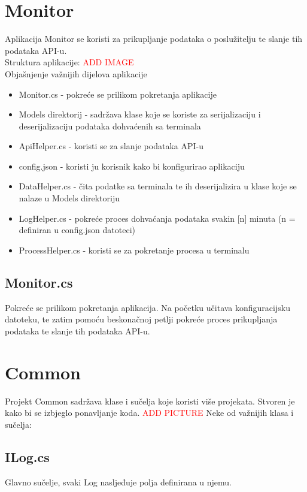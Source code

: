 \documentclass[zavrsnirad]{fer}
\begin{document}
\section{Monitor}
Aplikacija Monitor se koristi za prikupljanje podataka o poslužitelju te slanje tih podataka API-u.
\\Struktura aplikacije: \textcolor{red}{ADD IMAGE}
\\Objašnjenje važnijih dijelova aplikacije
\begin{itemize}
	\item Monitor.cs - pokreće se prilikom pokretanja aplikacije
	\item Models direktorij - sadržava klase koje se koriste za serijalizaciju i deserijalizaciju podataka dohvaćenih sa terminala
	\item ApiHelper.cs - koristi se za slanje podataka API-u
	\item config.json - koristi ju korisnik kako bi konfigurirao aplikaciju
	\item DataHelper.cs - čita podatke sa terminala te ih deserijalizira u klase koje se nalaze u Models direktoriju
	\item LogHelper.cs - pokreće proces dohvaćanja podataka svakin [n] minuta (n = definiran u config.json datoteci)
	\item ProcessHelper.cs - koristi se za pokretanje procesa u terminalu
\end{itemize}

\subsection{Monitor.cs}
Pokreće se prilikom pokretanja aplikacija. Na početku učitava konfiguracijsku datoteku, te zatim pomoću beskonačnoj petlji pokreće proces prikupljanja podataka te slanje tih podataka API-u.


\section{Common}
Projekt Common sadržava klase i sučelja koje koristi više projekata. Stvoren je kako bi se izbjeglo ponavljanje koda.
\textcolor{red}{ADD PICTURE}
Neke od važnijih klasa i sučelja:

\subsection{ILog.cs}
Glavno sučelje, svaki Log nasljeđuje polja definirana u njemu.
\end{document}

